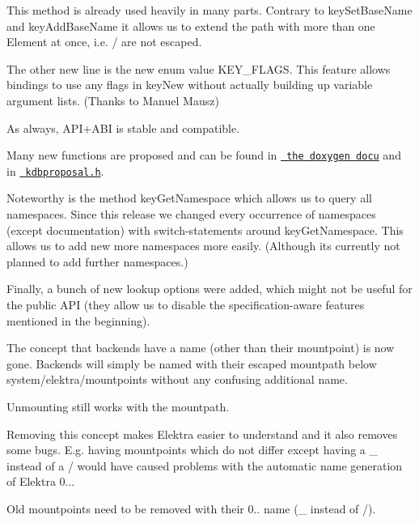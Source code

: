 \begin{DoxyCode}{0}
\end{DoxyCode}


This method is already used heavily in many parts. Contrary to {\ttfamily key\+Set\+Base\+Name} and {\ttfamily key\+Add\+Base\+Name} it allows us to extend the path with more than one Element at once, i.\+e. {\ttfamily /} are not escaped.

The other new line is the new enum value {\ttfamily K\+E\+Y\+\_\+\+F\+L\+A\+GS}. This feature allows bindings to use any flags in key\+New without actually building up variable argument lists. (Thanks to Manuel Mausz)

As always, A\+P\+I+\+A\+BI is stable and compatible.

Many new functions are proposed and can be found in \href{https://doc.libelektra.org/api/0.8.11/html}{\texttt{ the doxygen docu}} and in \href{https://github.com/ElektraInitiative/libelektra/blob/master/src/include/kdbproposal.h}{\texttt{ kdbproposal.\+h}}.

Noteworthy is the method {\ttfamily key\+Get\+Namespace} which allows us to query all namespaces. Since this release we changed every occurrence of namespaces (except documentation) with switch-\/statements around {\ttfamily key\+Get\+Namespace}. This allows us to add new more namespaces more easily. (Although its currently not planned to add further namespaces.)

Finally, a bunch of new lookup options were added, which might not be useful for the public A\+PI (they allow us to disable the specification-\/aware features mentioned in the beginning).

The concept that backends have a name (other than their mountpoint) is now gone. Backends will simply be named with their escaped mountpath below system/elektra/mountpoints without any confusing additional name.

Unmounting still works with the mountpath.

Removing this concept makes Elektra easier to understand and it also removes some bugs. E.\+g. having mountpoints which do not differ except having a {\ttfamily \+\_\+} instead of a {\ttfamily /} would have caused problems with the automatic name generation of Elektra 0...

Old mountpoints need to be removed with their 0.. name ({\ttfamily \+\_\+} instead of {\ttfamily /}).

